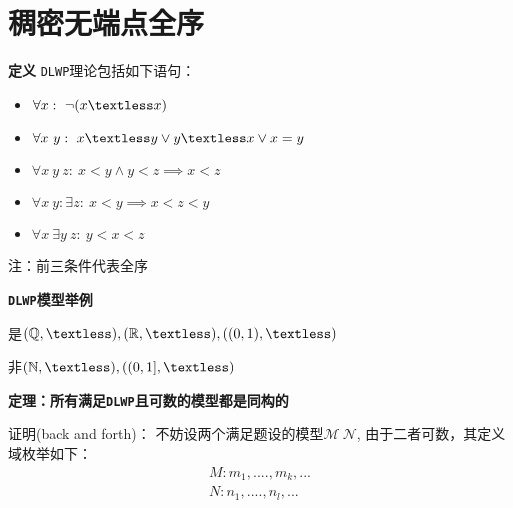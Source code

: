 \documentclass[UTF8, 9pt, a4paper]{ctexart}
\newcommand{\ksec}[2]{\noindent \textbf{\large #1} #2\par}
\begin{document}
	
	\section*{稠密无端点全序}
	
	\ksec{定义}{\texttt{DLWP}理论包括如下语句：}
	\begin{itemize}
		\item $ \forall x:\ \lnot (x \textless x) $
		\item $ \forall x\ y:\ x \textless y \lor y \textless x \lor x = y$	
		\item $ \forall x\ y\ z:\ x < y \land y < z \implies x < z $
		\item $ \forall x \ y: \exists z:\ x < y \implies x < z < y $
		\item $ \forall x\ \exists y\ z:\ y < x < z $
	\end{itemize}
	注：前三条件代表全序
	
	\ksec{\texttt{DLWP}模型举例}{}
		是$ (\mathbb{Q}, \textless), (\mathbb{R}, \textless), ((0, 1), \textless) $
		
		非$ (\mathbb{N}, \textless), ({(0, 1]}, \textless) $
		
	
	\ksec{定理：所有满足\texttt{DLWP}且可数的模型都是同构的}{}
	证明(back and forth)：
	不妨设两个满足题设的模型$ \mathcal{M}\ \mathcal{N} $, 由于二者可数，其定义域枚举如下：
		$$
		\begin{array}{l}
			M: m_1, ...., m_k, ...\\
			N: n_1, ...., n_l, ...\\
		\end{array}
		$$
		
\end{document}
